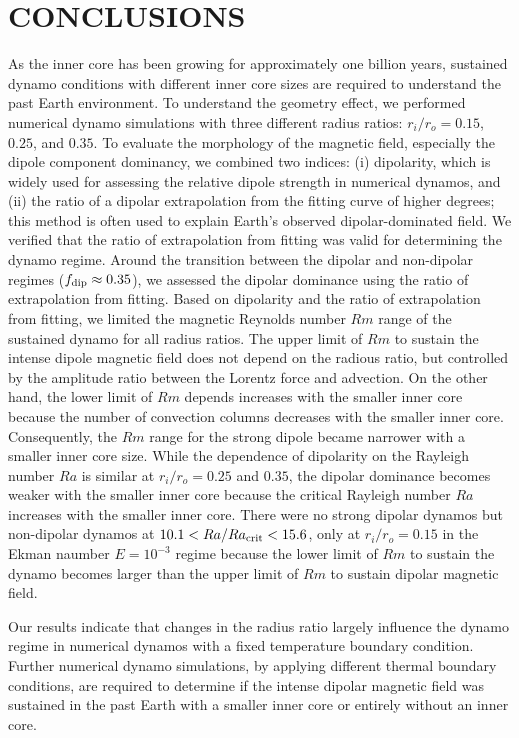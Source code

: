 \section{CONCLUSIONS}

As the inner core has been growing for approximately one billion years, sustained dynamo conditions with different inner core sizes are required to understand the past Earth environment. 
To understand the geometry effect, we performed numerical dynamo simulations with three different radius ratios: $r_i/r_o = 0.15$, $0.25$, and $0.35$. 
To evaluate the morphology of the magnetic field, especially the dipole component dominancy, we combined two indices: (i) dipolarity, which is widely used for assessing the relative dipole strength in numerical dynamos, and (ii) the ratio of a dipolar extrapolation from the fitting curve of higher degrees; this method is often used to explain Earth’s observed dipolar-dominated field. 
We verified that the ratio of extrapolation from fitting was valid for determining the dynamo regime. Around the transition between the dipolar and non-dipolar regimes ($f_{\rm dip} \approx 0.35$), we assessed the dipolar dominance using the ratio of extrapolation from fitting. 
Based on dipolarity and the ratio of extrapolation from fitting, we limited the magnetic Reynolds number $Rm$ range of the sustained dynamo for all radius ratios. 
{\color{blue}
The upper limit of $Rm$ to sustain the intense dipole magnetic field does not depend on the radious ratio, but controlled by the amplitude ratio between the Lorentz force and advection. On the other hand, the lower limit of $Rm$ depends increases with the smaller inner core because the number of convection columns decreases with the smaller inner core. Consequently, 
}
the $Rm$ range for the strong dipole became narrower with a smaller inner core size. 
While the dependence of dipolarity on the Rayleigh number $Ra$ is similar at $r_i/r_o = 0.25$ and $0.35$, the dipolar dominance becomes weaker with the smaller inner core 
{\color{blue}
because the critical Rayleigh number $Ra$ increases with the smaller inner core.
}
There were no strong dipolar dynamos but non-dipolar dynamos at $10.1 < Ra/Ra_{\rm crit} < 15.6$, only at $r_i/r_o = 0.15$ 
{\color{blue} in the Ekman naumber $E = 10^{-3}$ regime because the lower limit of $Rm$ to sustain the dynamo becomes larger than the upper limit of $Rm$ to sustain dipolar magnetic field. 
}

Our results indicate that changes in the radius ratio largely influence the dynamo regime in numerical dynamos with a fixed temperature boundary condition. 
Further numerical dynamo simulations, by applying different thermal boundary conditions, are required to determine if the intense dipolar magnetic field was sustained in the past Earth with a smaller inner core or entirely without an inner core.



